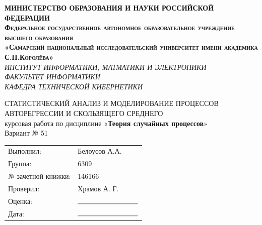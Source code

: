\documentclass[12pt, fleqn]{article}
\newcommand{\authorSurName}{Белоусов} %
\newcommand{\authorInitials}{ А.А.} %
\newcommand{\variantNumber}{51} %
\newcommand{\recordBookNumber}{146166} %
\begin{document}

\begin{titlepage}
							
	\center
							
							
	\textsc{\textbf{МИНИСТЕРСТВО ОБРАЗОВАНИЯ И НАУКИ РОССИЙСКОЙ ФЕДЕРАЦИИ}}\\[0.1cm]
	\textsc{\small\textbf{Федеральное государственное автономное образовательное учреждение высшего образования}}\\[0.05cm] 
	\textsc{\small\textbf{«Самарский национальный исследовательский университет
		имени академика С.П.Королёва»}}\\[0.05cm] 
	\textsc{\textit{ИНСТИТУТ ИНФОРМАТИКИ, МАТМАТИКИ И ЭЛЕКТРОНИКИ}}\\[0.2cm]
	\textsc{\textit{ФАКУЛЬТЕТ ИНФОРМАТИКИ}}\\[0.1cm]
	\textsc{\textit{КАФЕДРА ТЕХНИЧЕСКОЙ КИБЕРНЕТИКИ}}\\[0.5cm]
						
							
	\vfill\vfill
						    
							
	{\large СТАТИСТИЧЕСКИЙ АНАЛИЗ И МОДЕЛИРОВАНИЕ ПРОЦЕССОВ АВТОРЕГРЕССИИ И СКОЛЬЗЯЩЕГО СРЕДНЕГО}\\[0.3cm]
	{\large курсовая работа по дисциплине «\textbf{Теория случайных процессов}»}\\[0.5cm]
	{\centering\large Вариант № \variantNumber}\\[1.5cm]
						  
	\vfill\vfill\vfill
							
	\begin{minipage}{1\textwidth}
		\begin{flushright}
			\begin{tabular}{l l}
				Выполнил:                  & \authorSurName \authorInitials \\
				Группа:                      & 6309                           \\
				№ зачетной книжки: & \recordBookNumber              \\
				Проверил:                  & Храмов  А. Г.          \\
				Оценка:                      & $\rule{3cm}{0.15mm}$           \\
				Дата:                          & $\rule{3cm}{0.15mm}$           
			\end{tabular}
		\end{flushright}
	\end{minipage}
							

\end{titlepage}
\end{document}
